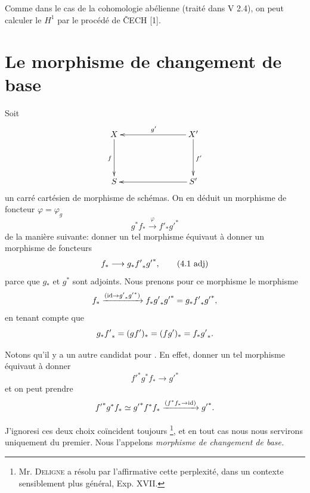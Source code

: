 \documentclass[10pt]{../fichiers-configuration-latex/smfart}
\begin{document}
\setcounter{subsection}{4}
\subsection{}
Comme dans le cas de la cohomologie abélienne (traité dans V 2.4), on
peut calculer le $H^1$ par le procédé de \v{C}ECH [1].

\section{Le morphisme de changement de
  base}\pageoriginale 

Soit
$$
\xymatrix@C=2.75cm@R=1.5cm{
X   \ar[d]_{f}& X'\ar[l]_{g'}\ar[d]^{f'}\\
S       & S'\ar[l]
}
$$
un carré cartésien de morphisme de schémas. On en déduit un morphisme
de foncteur $\varphi=\varphi_g$
\begin{equation*}
g^{\ast}f_{\ast}\xrightarrow{\varphi}f'_{\ast}{g'}^{\ast}\tag{4.1}
\end{equation*}
de la manière suivante: donner un tel morphisme équivaut à donner un
morphisme de foncteurs
\begin{equation*}
f_{\ast}\longrightarrow g_{\ast}{f'}_{\ast}{g'}^{\ast}{},\tag{4.1 adj}
\end{equation*}\label{4.1 adj} 
parce que $g_{\ast}$ et $g^{\ast}$ sont adjoints. Nous prenons pour ce
morphisme le morphisme
$$
f_{\ast}\xrightarrow{(\operatorname{id}\rightarrow {g'}_{\ast}{g'}^{\ast})}
f_{\ast}{g'}_{\ast}{g'}^{\ast}=g_{\ast}{f'}_{\ast}{g'}^{\ast}{},
$$
en tenant compte que
$$
g_{\ast}{f'}_{\ast}=(gf')_{\ast}=(fg')_{\ast}=f_{\ast}{g'}_{\ast}{}.
$$

Notons qu'il y a un autre candidat pour . En effet, donner un tel
morphisme équivaut à donner
$$
{f'}^{\ast}g^{\ast}f_{\ast}\longrightarrow {g'}^{\ast}
$$
et on peut prendre
$$
{f'}^{\ast}g^{\ast}f_{\ast}\simeq
{g'}^{\ast}f^{\ast}f_{\ast}\xrightarrow{(f^{\ast}f_{\ast}\rightarrow
  \operatorname{id})} {g'}^{\ast}{}.
$$

J'ignore\pageoriginale si ces deux choix coïncident toujours
\footnote[1]{Mr. \textsc{Deligne} a résolu par l'affirmative cette perplexité,
dans un contexte sensiblement plus général, \cf Exp. XVII.}, et en
tout cas nous nous servirons uniquement du premier. Nous l'appelons
\emph{morphisme de changement de base.}
\end{document}
